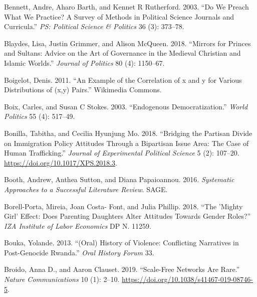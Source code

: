 \documentclass{book}
\newlength{\cslhangindent}
\newlength{\cslentryspacingunit} %
\newenvironment{CSLReferences}[2] %
 {%
  \setlength{\parindent}{0pt}
  \ifodd #1
  \let\oldpar\par
  \def\par{\hangindent=\cslhangindent\oldpar}
  \fi
  \setlength{\parskip}{#2\cslentryspacingunit}
 }%
 {}
\begin{document}
\begin{CSLReferences}{1}{0}
\leavevmode{}%
Bennett, Andre, Aharo Barth, and Kennet R Rutherford. 2003. {``Do {We Preach
What We Practice}? {A Survey} of {Methods} in {Political Science Journals} and
{Curricula}.''} \emph{PS: Political Science \& Politics} 36 (3): 373--78.

\leavevmode{}%
Blaydes, Lisa, Justin Grimmer, and Alison McQueen. 2018. {``Mirrors for
Princes and Sultans: Advice on the Art of Governance in the Medieval Christian
and Islamic Worlds.''} \emph{\emph{Journal of Politics}} 80 (4): 1150--67.

\leavevmode{}%
Boigelot, Denis. 2011. {``An Example of the Correlation of x and y for Various
Distributions of (x,y) Pairs.''} {Wikimedia Commons}.

\leavevmode{}%
Boix, Carles, and Susan C Stokes. 2003. {``Endogenous Democratization.''}
\emph{World Politics} 55 (4): 517--49.

\leavevmode{}%
Bonilla, Tabitha, and Cecilia Hyunjung Mo. 2018. {``Bridging the Partisan
Divide on Immigration Policy Attitudes Through a Bipartisan Issue Area: The
Case of Human Trafficking.''} \emph{Journal of Experimental Political Science}
5 (2): 107--20. \url{https://doi.org/10.1017/XPS.2018.3}.

\leavevmode{}%
Booth, Andrew, Anthea Sutton, and Diana Papaioannou. 2016. \emph{Systematic
{Approaches} to a {Successful Literature Review}}. {SAGE}.

\leavevmode{}%
Borell-Porta, Mireia, Joan Costa- Font, and Julia Phillip. 2018. {``The
'{Mighty Girl}' {Effect}: {Does Parenting Daughters Alter Attitudes} Towards
{Gender Roles}?''} \emph{IZA Institute of Labor Economics} DP N. 11259.

\leavevmode{}%
Bouka, Yolande. 2013. {``(Oral) History of Violence: Conflicting Narratives in
Post-Genocide Rwanda.''} \emph{Oral History Forum} 33.

\leavevmode{}%
Broido, Anna D., and Aaron Clauset. 2019. {``Scale-Free Networks Are Rare.''}
\emph{Nature Communications} 10 (1): 2--10.
\url{https://doi.org/10.1038/s41467-019-08746-5}.


\end{CSLReferences}
\end{document}
